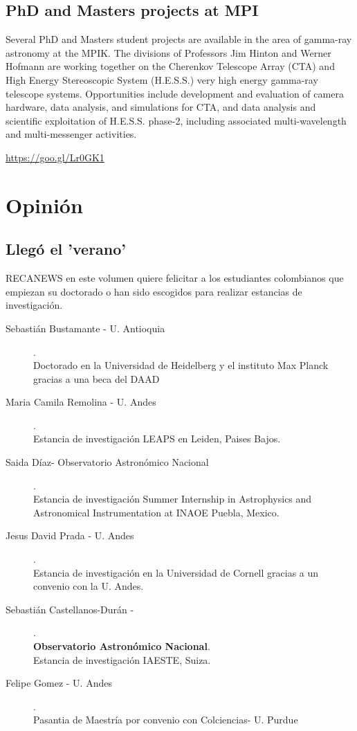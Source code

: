 \documentclass{book}
\begin{document}
\subsection{PhD and Masters projects at MPI}

Several PhD and Masters student projects are available in the area of gamma-ray astronomy at the MPIK. The divisions of Professors Jim Hinton and Werner Hofmann are working together on the Cherenkov Telescope Array (CTA) and High Energy Stereoscopic System (H.E.S.S.) very high energy gamma-ray telescope systems. Opportunities include development and evaluation of camera hardware, data analysis, and simulations for CTA, and data analysis and scientific exploitation of H.E.S.S. phase-2, including associated multi-wavelength and multi-messenger activities. 
\begin{center}
\url{https://goo.gl/Lr0GK1}
\end{center}
\newpage

\section*{Opinión}
\subsection{Llegó el 'verano'}
RECANEWS en este volumen quiere felicitar a los estudiantes colombianos que empiezan su doctorado o han sido escogidos para realizar estancias de investigación.

\begin{description}
\item[Sebastián Bustamante - U. Antioquia]. \\
Doctorado en la Universidad de Heidelberg y el instituto Max Planck gracias a una beca del DAAD 
\item[Maria Camila Remolina - U. Andes].\\
Estancia de investigación LEAPS en Leiden, Paises Bajos.
\item[Saida  Díaz- Observatorio Astronómico Nacional].\\
Estancia de investigación Summer Internship in Astrophysics and Astronomical Instrumentation at INAOE Puebla, Mexico.
\item[Jesus David Prada - U. Andes].\\
Estancia de investigación en la Universidad de Cornell gracias a un convenio con la U. Andes.
\item[Sebastián Castellanos-Durán - ].\\
\textbf{Observatorio Astronómico Nacional}.\\
Estancia de investigación IAESTE, Suiza.
\item[Felipe Gomez - U. Andes].\\
Pasantia de Maestría por convenio con Colciencias- U. Purdue
\end{description}
\end{document}
